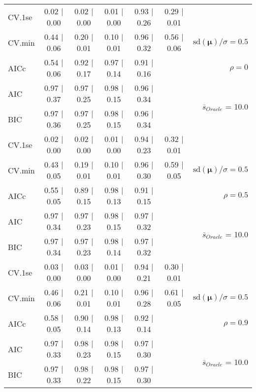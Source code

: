 \begin{table}
\begin{center}
\begin{tabular}{l*{5}{c}|r}
 \hline 
CV.1se & 0.02 $\mid$ 0.00 & 0.02 $\mid$ 0.00 & 0.01 $\mid$ 0.00 & 0.93 $\mid$ 0.26 & 0.29 $\mid$ 0.01 & \\
CV.min & 0.44 $\mid$ 0.06 & 0.20 $\mid$ 0.01 & 0.10 $\mid$ 0.01 & 0.96 $\mid$ 0.32 & 0.56 $\mid$ 0.06 &  $\mathrm{sd}(\mathbf{\mu})/\sigma=0.5$ \\
AICc & 0.54 $\mid$ 0.06 & 0.92 $\mid$ 0.17 & 0.97 $\mid$ 0.14 & 0.91 $\mid$ 0.16 & & $\rho=0$ \\
AIC & 0.97 $\mid$ 0.37 & 0.97 $\mid$ 0.25 & 0.98 $\mid$ 0.15 & 0.96 $\mid$ 0.34 & &  \multirow{2}{*}{$\bar{s}_{Oracle}$ = 10.0} \\
BIC & 0.97 $\mid$ 0.36 & 0.97 $\mid$ 0.25 & 0.98 $\mid$ 0.15 & 0.96 $\mid$ 0.34 & &  \\
 \hline 
CV.1se & 0.02 $\mid$ 0.00 & 0.02 $\mid$ 0.00 & 0.01 $\mid$ 0.00 & 0.94 $\mid$ 0.23 & 0.32 $\mid$ 0.01 & \\
CV.min & 0.43 $\mid$ 0.05 & 0.19 $\mid$ 0.01 & 0.10 $\mid$ 0.01 & 0.96 $\mid$ 0.30 & 0.59 $\mid$ 0.05 &  $\mathrm{sd}(\mathbf{\mu})/\sigma=0.5$ \\
AICc & 0.55 $\mid$ 0.05 & 0.89 $\mid$ 0.15 & 0.98 $\mid$ 0.13 & 0.91 $\mid$ 0.15 & & $\rho=0.5$ \\
AIC & 0.97 $\mid$ 0.34 & 0.97 $\mid$ 0.23 & 0.98 $\mid$ 0.15 & 0.97 $\mid$ 0.32 & &  \multirow{2}{*}{$\bar{s}_{Oracle}$ = 10.0} \\
BIC & 0.97 $\mid$ 0.34 & 0.97 $\mid$ 0.23 & 0.98 $\mid$ 0.14 & 0.97 $\mid$ 0.32 & &  \\
 \hline 
CV.1se & 0.03 $\mid$ 0.00 & 0.03 $\mid$ 0.00 & 0.01 $\mid$ 0.00 & 0.94 $\mid$ 0.21 & 0.30 $\mid$ 0.01 & \\
CV.min & 0.46 $\mid$ 0.06 & 0.21 $\mid$ 0.01 & 0.10 $\mid$ 0.01 & 0.96 $\mid$ 0.28 & 0.61 $\mid$ 0.05 &  $\mathrm{sd}(\mathbf{\mu})/\sigma=0.5$ \\
AICc & 0.58 $\mid$ 0.05 & 0.90 $\mid$ 0.14 & 0.98 $\mid$ 0.13 & 0.92 $\mid$ 0.14 & & $\rho=0.9$ \\
AIC & 0.97 $\mid$ 0.33 & 0.98 $\mid$ 0.23 & 0.98 $\mid$ 0.15 & 0.97 $\mid$ 0.30 & &  \multirow{2}{*}{$\bar{s}_{Oracle}$ = 10.0} \\
BIC & 0.97 $\mid$ 0.33 & 0.98 $\mid$ 0.22 & 0.98 $\mid$ 0.15 & 0.97 $\mid$ 0.30 & &  \\
 \hline 
\end{tabular}
\end{center}
\vspace{-1cm}
\end{table}




